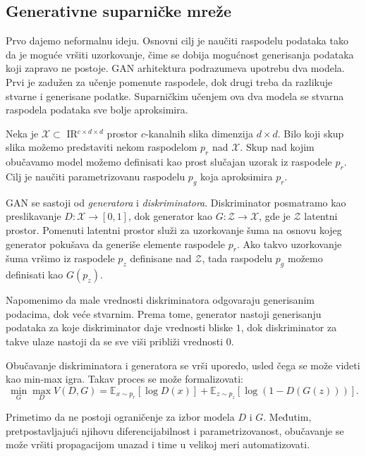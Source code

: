 \documentclass[12pt, a4paper]{article}
\newcommand{\R}{$ {\rm I\!R}$}
\begin{document}
\subsection{Generativne suparničke mreže}
	Prvo dajemo neformalnu ideju. Osnovni cilj je naučiti raspodelu podataka tako da je moguće vršiti uzorkovanje, čime se dobija mogućnost generisanja podataka koji zapravo ne postoje. GAN arhitektura podrazumeva upotrebu dva modela. Prvi je zadužen za učenje pomenute raspodele, dok drugi treba da razlikuje stvarne i generisane podatke. Suparničkim učenjem ova dva modela se stvarna raspodela podataka sve bolje aproksimira.
	
	Neka je $\mathcal{X}\subset \R^{c \times d \times d}$ prostor $c$-kanalnih slika dimenzija $d\times d$. Bilo koji skup slika možemo predstaviti nekom raspodelom $p_r$ nad $\mathcal{X}$. Skup nad kojim obučavamo model možemo definisati kao prost slučajan uzorak iz raspodele $p_r$. Cilj je naučiti parametrizovanu raspodelu $p_g$ koja aproksimira $p_r$.
	
	GAN se sastoji od \textit{generatora} i \textit{diskriminatora}. Diskriminator posmatramo kao preslikavanje $D: \mathcal{X} \rightarrow [0, 1]$, dok generator kao $G:\mathcal{Z} \rightarrow \mathcal{X}$, gde je $\mathcal{Z}$ latentni prostor. Pomenuti latentni prostor služi za uzorkovanje šuma na osnovu kojeg generator pokušava da generiše elemente raspodele $p_r$. Ako takvo uzorkovanje šuma vršimo iz raspodele $p_z$ definisane nad $\mathcal{Z}$, tada raspodelu $p_g$ možemo definisati kao $G(p_z)$.
	
	Napomenimo da male vrednosti diskriminatora odgovaraju generisanim podacima, dok veće stvarnim. Prema tome, generator nastoji generisanju podataka za koje diskriminator daje vrednosti bliske $1$, dok diskriminator za takve ulaze nastoji da se sve viši približi vrednosti $0$.
	
	Obučavanje diskriminatora i generatora se vrši uporedo, usled čega se može videti kao min-max igra. Takav proces se može formalizovati:
	\begin{equation}
	\min_{G}\max_{D}V(D, G) = \mathbb{E}_{x \sim p_r}[\log D(x)] + \mathbb{E}_{z \sim p_z}[\log(1 - D(G(z)))].
	\label{eq:GANClassic}
	\end{equation}
	
	Primetimo da ne postoji ograničenje za izbor modela $D$ i $G$. Međutim, pretpostavljajući njihovu diferencijabilnost i parametrizovanost, obučavanje se može vršiti propagacijom unazad i time u velikoj meri automatizovati.
	
\end{document}
